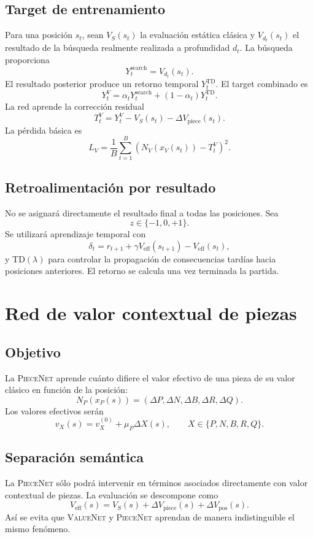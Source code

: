 \documentclass[11pt,a4paper]{article}
\newcommand{\ValueNet}{\textsc{ValueNet}}
\newcommand{\PieceNet}{\textsc{PieceNet}}
\begin{document}
\subsection{Target de entrenamiento}
Para una posición $s_t$, sean $V_S(s_t)$ la evaluación estática clásica y $V_{d_t}(s_t)$ el resultado de la búsqueda realmente realizada a profundidad $d_t$. La búsqueda proporciona
\[
Y_t^{\mathrm{search}}=V_{d_t}(s_t).
\]
El resultado posterior produce un retorno temporal $Y_t^{\mathrm{TD}}$. El target combinado es
\[
Y_t^V=\alpha_tY_t^{\mathrm{search}}+(1-\alpha_t)Y_t^{\mathrm{TD}}.
\]
La red aprende la corrección residual
\[
\boxed{T_t^V=Y_t^V-V_S(s_t)-\Delta V_{\mathrm{piece}}(s_t)}.
\]
La pérdida básica es
\[
L_V=\frac1B\sum_{t=1}^{B}\left(N_V(x_V(s_t))-T_t^V\right)^2.
\]

\subsection{Retroalimentación por resultado}
No se asignará directamente el resultado final a todas las posiciones. Sea
\[
z\in\{-1,0,+1\}.
\]
Se utilizará aprendizaje temporal con
\[
\delta_t=r_{t+1}+\gamma V_{\mathrm{eff}}(s_{t+1})-V_{\mathrm{eff}}(s_t),
\]
y TD$(\lambda)$ para controlar la propagación de consecuencias tardías hacia posiciones anteriores. El retorno se calcula una vez terminada la partida.

\section{Red de valor contextual de piezas}
\subsection{Objetivo}
La \PieceNet{} aprende cuánto difiere el valor efectivo de una pieza de su valor clásico en función de la posición:
\[
N_P(x_P(s))=(\Delta P,\Delta N,\Delta B,\Delta R,\Delta Q).
\]
Los valores efectivos serán
\[
v_X(s)=v_X^{(0)}+\mu_P\Delta X(s),\qquad X\in\{P,N,B,R,Q\}.
\]

\subsection{Separación semántica}
La \PieceNet{} sólo podrá intervenir en términos asociados directamente con valor contextual de piezas. La evaluación se descompone como
\[
V_{\mathrm{eff}}(s)=V_S(s)+\Delta V_{\mathrm{piece}}(s)+\Delta V_{\mathrm{pos}}(s).
\]
Así se evita que \ValueNet{} y \PieceNet{} aprendan de manera indistinguible el mismo fenómeno.
\end{document}
